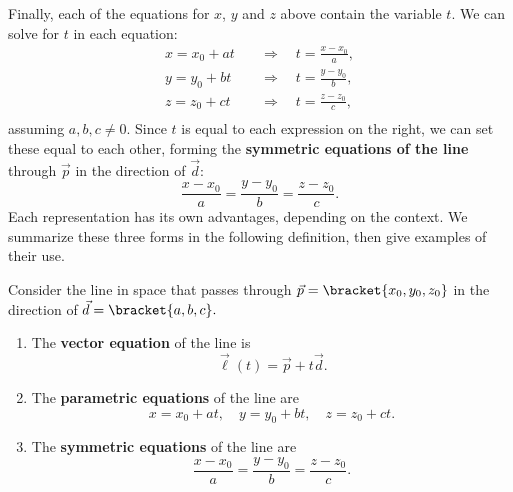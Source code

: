 Finally, each of the equations for $x$, $y$ and $z$ above contain the variable $t$. We can solve for $t$ in each equation:
\begin{align*}
x = x_0+at \quad&\Rightarrow\quad t = \frac{x-x_0}{a},\\
y = y_0+bt \quad&\Rightarrow\quad t = \frac{y-y_0}{b},\\
z = z_0+ct \quad&\Rightarrow\quad t = \frac{z-z_0}{c},\\
\end{align*}
assuming $a,b,c\neq 0$.
Since $t$ is equal to each expression on the right, we can set these equal to each other, forming the \textbf{symmetric equations of the line} through $\vec p$ in the direction of $\vec d$:
\[\frac{x-x_0}{a} = \frac{y-y_0}{b}=\frac{z-z_0}{c}.\]
Each representation has its own advantages, depending on the context. We summarize these three forms in the following definition, then give examples of their use.

{Consider the line in space that passes through $\vec p =\bracket{x_0,y_0,z_0}$ in the direction of $\vec d =\bracket{a,b,c}.$
\begin{enumerate}
	\item The \textbf{vector equation} of the line is
	\[\vec \ell(t) = \vec p+t\vec d.\]
	\item	The \textbf{parametric equations} of the line are
	\[x = x_0+at, \quad y=y_0+bt, \quad z = z_0+ct .\]
	\item	The \textbf{symmetric equations} of the line are
	\[\frac{x-x_0}{a} = \frac{y-y_0}{b}=\frac{z-z_0}{c}.\]
\end{enumerate}}


